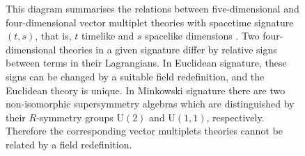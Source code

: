 \begin{figure}[!h]
\centering


\caption[Summary of the relations between five-dimensional and four-dimensional vector multiplet theories of arbitrary signature]{This diagram summarises the relations between five-dimensional and four-dimensional vector multiplet theories with spacetime signature $(t,s)$, that is, $t$ timelike and $s$ spacelike dimensions \cite{Gall:2019mfa}. Two four-dimensional theories in a given signature differ by relative signs between terms in their Lagrangians. In Euclidean signature, these signs can be changed by a suitable field redefinition, and the Euclidean theory is unique. In Minkowski signature there are two non-isomorphic supersymmetry algebras which are distinguished by their $R$-symmetry groups U$(2)$ and U$(1,1)$, respectively. Therefore the corresponding vector multiplets theories cannot be related by a field redefinition.
\label{Fig:dim_red}}
\end{figure}


